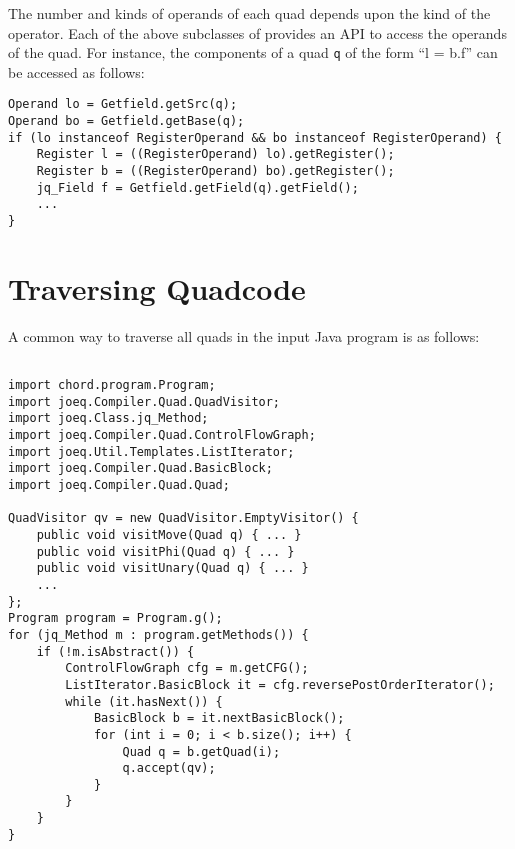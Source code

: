The number and kinds of operands of each quad depends upon the kind of
the operator.  Each of the above subclasses of 
provides an API to access the operands of the quad.  For instance,
the components of a  quad {\tt q} of the form ``l = b.f'' can be accessed as follows:

\begin{framed}
\begin{verbatim}
Operand lo = Getfield.getSrc(q);
Operand bo = Getfield.getBase(q);
if (lo instanceof RegisterOperand && bo instanceof RegisterOperand) {
    Register l = ((RegisterOperand) lo).getRegister();
    Register b = ((RegisterOperand) bo).getRegister();
    jq_Field f = Getfield.getField(q).getField();
    ...
}
\end{verbatim}
\end{framed}

\section{Traversing Quadcode}
\label{sec:traversing}

A common way to traverse all quads in the input Java program is as follows:

\texonly{\newpage}

\begin{framed}
\begin{verbatim}

import chord.program.Program;
import joeq.Compiler.Quad.QuadVisitor;
import joeq.Class.jq_Method;
import joeq.Compiler.Quad.ControlFlowGraph;
import joeq.Util.Templates.ListIterator;
import joeq.Compiler.Quad.BasicBlock;
import joeq.Compiler.Quad.Quad;

QuadVisitor qv = new QuadVisitor.EmptyVisitor() {
    public void visitMove(Quad q) { ... }
    public void visitPhi(Quad q) { ... }
    public void visitUnary(Quad q) { ... }
    ...
};
Program program = Program.g();
for (jq_Method m : program.getMethods()) {
    if (!m.isAbstract()) {
        ControlFlowGraph cfg = m.getCFG();
        ListIterator.BasicBlock it = cfg.reversePostOrderIterator();
        while (it.hasNext()) {
            BasicBlock b = it.nextBasicBlock();
            for (int i = 0; i < b.size(); i++) {
                Quad q = b.getQuad(i);
                q.accept(qv);
            }
        }
    }
}
\end{verbatim}
\end{framed}

